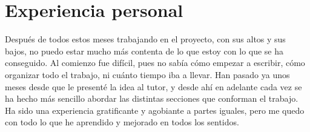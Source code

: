 \section{Experiencia personal}

Después de todos estos meses trabajando en el proyecto, con sus altos y sus bajos, no puedo estar mucho más contenta de lo que estoy con lo que se ha conseguido. Al comienzo fue difícil, pues no sabía cómo empezar a escribir, cómo organizar todo el trabajo, ni cuánto tiempo iba a llevar. Han pasado ya unos meses desde que le presenté la idea al tutor, y desde ahí en adelante cada vez se ha hecho más sencillo abordar las distintas secciones que conforman el trabajo. Ha sido una experiencia gratificante y agobiante a partes iguales, pero me quedo con todo lo que he aprendido y mejorado en todos los sentidos. 